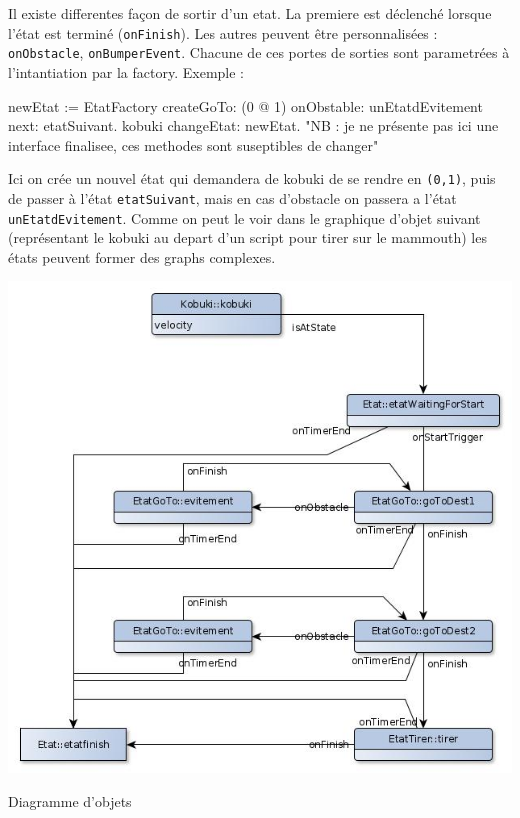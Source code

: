 \documentclass[a4paper, 11pt]{article}
\begin{document}
Il existe differentes façon de sortir d'un etat. La premiere est
déclenché lorsque l'état est terminé (\texttt{onFinish}). Les autres
peuvent être personnalisées : \texttt{onObstacle},
\texttt{onBumperEvent}. Chacune de ces portes de sorties sont
parametrées à l'intantiation par la factory. Exemple :

\begin{code}
  newEtat := EtatFactory createGoTo: (0 @ 1) onObstable: unEtatdEvitement next: etatSuivant.
  kobuki changeEtat: newEtat.
  "NB : je ne présente pas ici une interface finalisee, ces methodes sont suseptibles de changer"
\end{code}

Ici on crée un nouvel état qui demandera de kobuki de se rendre en
\texttt{(0,1)}, puis de passer à l'état \texttt{etatSuivant}, mais en
cas d'obstacle on passera a l'état \texttt{unEtatdEvitement}.  Comme
on peut le voir dans le graphique d'objet suivant (représentant le
kobuki au depart d'un script pour tirer sur le mammouth) les états
peuvent former des graphs complexes.
\begin{center}
  \includegraphics[width=\linewidth]{./UMLObjectEtat.jpg}
  \caption{Diagramme d'objets}
  \label{dia_obj}
\end{center}
\end{document}
